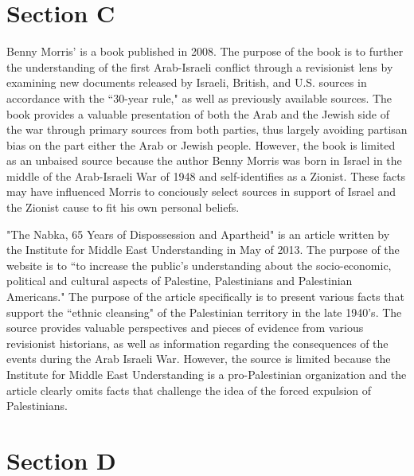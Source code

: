 \documentclass{turabian-researchpaper}
\begin{document}
\section{Section C}

Benny Morris'  is a book published in 2008.  The purpose of the book is to further the understanding of the first Arab-Israeli conflict through a revisionist lens by examining new documents released by Israeli, British, and U.S. sources in accordance with the ``30-year rule," as well as previously available sources.  The book provides a valuable presentation of both the Arab and the Jewish side of the war through primary sources from both parties, thus largely avoiding partisan bias on the part either the Arab or Jewish people.  However, the book is limited as an unbaised source because the author Benny Morris was born in Israel in the middle of the Arab-Israeli War of 1948 and self-identifies as a Zionist.  These facts may have influenced Morris to conciously select sources in support of Israel and the Zionist cause to fit his own personal beliefs.

\noindent {}

"The Nabka, 65 Years of Dispossession and Apartheid" is an article written by the Institute for Middle East Understanding in May of 2013.  The purpose of the website is to ``to increase the public's understanding about the socio-economic, political and cultural aspects of Palestine, Palestinians and Palestinian Americans."  The purpose of the article specifically is to present various facts that support the ``ethnic cleansing" of the Palestinian territory in the late 1940's.  The source provides valuable perspectives and pieces of evidence from various revisionist historians, as well as information regarding the consequences of the events during the Arab Israeli War.  However, the source is limited because the Institute for Middle East Understanding is a pro-Palestinian organization and the article clearly omits facts that challenge the idea of the forced expulsion of Palestinians.

\section{Section D}
\end{document}
